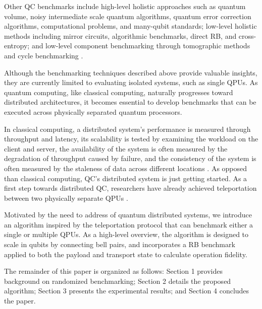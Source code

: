 Other QC benchmarks include high-level holistic approaches such as quantum volume, noisy intermediate scale quantum algorithms, quantum error correction algorithms, computational problems, and many-qubit standards; low-level holistic methods including mirror circuits, algorithmic benchmarks, direct RB, and cross-entropy; and low-level component benchmarking through tomographic methods and cycle benchmarking \cite{proctorBenchmarkingQuantumComputers2025_2025}.

Although the benchmarking techniques described above provide valuable insights, they are currently limited to evaluating isolated systems, such as single QPUs. As quantum computing, like classical computing, naturally progresses toward distributed architectures, it becomes essential to develop benchmarks that can be executed across physically separated quantum processors. \cite{caleffiDistributedQuantumComputing_2024}

In classical computing, a distributed system's performance is measured through throughput and latency, its scalability is tested by examining the workload on the client and server, the availability of the system is often measured by the degradation of throughput caused by failure, and the consistency of the system is often measured by the staleness of data across different locations \cite{andreoliniBenchmarkingModelsTools_2002}. As opposed than classical computing, QC's distributed system is just getting started. As a first step towards distributed QC, researchers have already achieved teleportation between two physically separate QPUs \cite{kangTeleportingTwoqubitEntanglementa_2025}. 

Motivated by the need to address of quantum distributed systems, we introduce an algorithm inspired by the teleportation protocol that can benchmark either a single or multiple QPUs. As a high-level overview, the algorithm is designed to scale in qubits by connecting bell pairs, and incorporates a RB benchmark applied to both the payload and transport state to calculate operation fidelity.

The remainder of this paper is organized as follows: Section 1 provides background on randomized benchmarking; Section 2 details the proposed algorithm; Section 3 presents the experimental results; and Section 4 concludes the paper.
